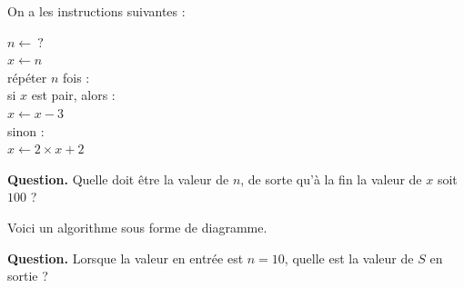 \documentclass[class=report,crop=false, 12pt]{standalone}
\begin{document}
\begin{enigme}[Si ... alors ...]

On a les instructions suivantes :

\begin{center}
\begin{minipage}{0.3\textwidth}
$n \leftarrow \ ?$ \\
$x \leftarrow n$ \\
répéter $n$ fois : \\
\indentation si $x$ est pair, alors : \\ 
\indentation\indentation $x \leftarrow x - 3$ \\
\indentation sinon : \\
\indentation\indentation $x \leftarrow 2\times x + 2$
\end{minipage}
\end{center}

\bigskip

\textbf{Question.} Quelle doit être la valeur de $n$, de sorte qu'à la fin la valeur de $x$ soit $100$ ?


\end{enigme}





\begin{enigme}[Boucles I]

Voici un algorithme sous forme de diagramme.
 
\bigskip

\textbf{Question.} Lorsque la valeur en entrée est $n=10$, quelle est la valeur de $S$ en sortie ?


\end{enigme}
\end{document}
